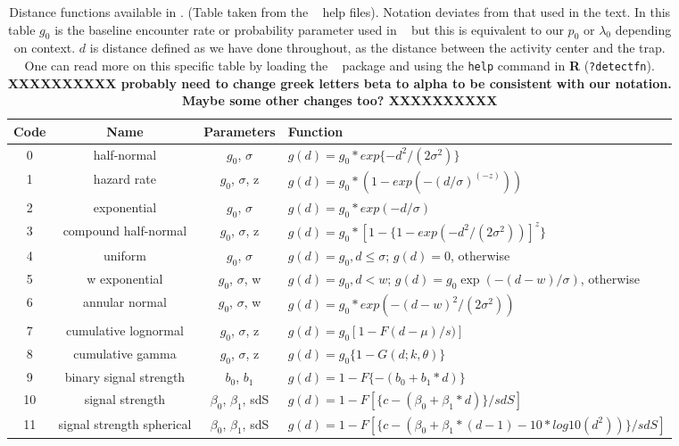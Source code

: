 \begin{table}[ht]
\centering
\caption{
  Distance functions available in \secr.  (Table taken from the \secr~
  help files). Notation deviates from that used in the text.
  In this table $g_{0}$ is the baseline encounter rate or probability
  parameter used in \secr~ but this is equivalent to our $p_{0}$ or
  $\lambda_{0}$ depending on context. $d$ is distance defined as we have done throughout,
  as the distance between the activity center and the trap.
  One can read more on this specific table by loading the \secr~ package and using the
  {\tt help} command in {\bf R} ({\tt ?detectfn}).
 {\bf XXXXXXXXXX probably need to change greek letters beta to alpha
   to be consistent with our notation. Maybe some other changes too? XXXXXXXXXX}
}
\begin{tabular}{cccl}
\hline \hline
Code & Name & Parameters & Function  \\ \hline
0 & half-normal &$g_0$, $\sigma$          &  $g(d) = g_0 * exp\{-d^2 / (2  \sigma^2) \}$  \\
1 &hazard rate  & $g_0$, $\sigma$, z      &  $g(d) = g_0 * (1 - exp(- (d / \sigma) ^(-z) ))$ \\
2 &exponential   &$g_0$, $\sigma$    &  $g(d) = g_0 * exp(- d / \sigma)$ \\
3 &compound half-normal  & $g_0$, $\sigma$, z & $g(d) = g_0 * [1 - \{1 - exp(-d^2 / (2 \sigma^2))]^z\}$ \\
4 &uniform     & $g_0$, $\sigma$     &
\parbox[t]{2in}{ $g(d) = g_{0}, d \leq \sigma$; \\
                 $g(d)= 0$, otherwise
} \\
5 &w exponential            & $g_0$, $\sigma$, w &
\parbox[t]{2in}{ $g(d) = g_{0}, d < w$; \\
                 $g(d) = g_{0} \exp(- (d - w) / \sigma)$, otherwise
} \\
6 &annular normal           & $g_0$, $\sigma$, w & $g(d) = g_0 * exp(-(d-w)^2 / (2 \sigma^2))$ \\
7 &cumulative lognormal     & $g_0$, $\sigma$, z & $g(d) = g_0 [1 -F{(d-\mu)/s)}]$  \\
8 &cumulative gamma         & $g_0$, $\sigma$, z  & $g(d) = g_0 \{ 1 - G (d; k,  \theta) \}$  \\
9 &binary signal strength   & $b_0$, $b_1$       & $g(d) = 1 - F \{- (b_0 + b_1 * d) \}$ \\
10&signal strength          & $\beta_0$, $\beta_1$, sdS  &
  $g(d) = 1 - F[ \{c - (\beta_0 + \beta_1 * d)\} / sdS]$  \\
11&signal strength spherical&  $\beta_0$, $\beta_1$, sdS & 
\parbox[t]{2in}{ $g(d) = 1 - F[\{c - (\beta_0 + \beta_1 * (d-1)- 10 * log10 ( d^2 ) ) \} / sdS ]$ 
} \\

\end{tabular}
\label{covariates.tab.detmodels}
\end{table}

